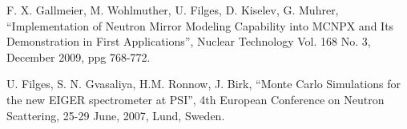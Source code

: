 \documentclass[a4paper,
              ]{jacow}
\begin{document}
\begin{thebibliography}{99} %

	F. X. Gallmeier, M. Wohlmuther, U. Filges, D. Kiselev, G. Muhrer,
	``Implementation of Neutron Mirror Modeling Capability into MCNPX and Its Demonstration in First Applications'',
  Nuclear Technology Vol. 168 No. 3, December 2009, ppg 768-772.

  U. Filges, S. N. Gvasaliya, H.M. Ronnow, J. Birk,
  ``Monte Carlo Simulations for the new EIGER spectrometer at PSI'',
  4th European Conference on Neutron Scattering, 25-29 June, 2007, Lund, Sweden.

\end{thebibliography}
\end{document}

